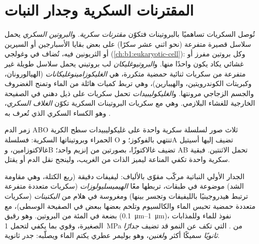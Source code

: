 \section{المقترنات السكرية وجدار النبات}

\begin{definition}\label{def:b1:carbohydrates:glycoconjugate}
تُوصل السكريات تساهميًا بالبروتينات  فتكوّن
\emph{مقترنات سكرية}. و\emph{البروتين
السكري} يحمل سلاسل قصيرة متفرعة (نحو اثني عشر
سكرًا) على بعض بقايا الأسبارجين أو السيرين أو الثريونين فيه، تُضاف في
 وغولجي (\cref{ch:b1:eukaryotic-cell}): وكل
بروتين مفرز أو غشائي يكاد يكون واحدًا منها.
و\emph{البروتيوغليكان} لب بروتيني يحمل سلاسل
طويلة غير متفرعة من سكريات ثنائية حمضية متكررة، هي
\emph{الغليكوزامينوغليكانات} (الهيالورونان،
وكبريتات الكوندرويتين، والهيبارين)، وهي تربط كميات هائلة من الماء
وتمنح الغضروف والجسم الزجاجي  مرونتها.
و\emph{الغليكوليبيدات} تحمل سكريات على ذيل دهني في
الصفيحة الخارجية للغشاء البلازمي. وهي مع سكريات البروتينات السكرية
تكوّن \emph{الغلاف السكري}، وهو الكساء السكري الذي
تُعرف به .
\end{definition}

\begin{example}\label{ex:b1:carbohydrates:abo}
زمر الدم ABO ثلاث صور لسلسلة سكرية واحدة على غليكوليبيدات سطح الكرية
الحمراء وبروتيناتها السكرية: فسلسلة O تنتهي بالفوكوز؛ وA تضيف إليها
أسيتيل غالاكتوزامين، وB تضيف غالاكتوزًا، بصورتين من إنزيم واحد؛
 AB تحمل الاثنتين. فبقية سكرية واحدة تكفي  المناعة ليميز
الذات من الغريب، ولينجح نقل الدم أو يقتل.
\end{example}

\begin{proposition}\label{prop:b1:carbohydrates:wall}
الجدار الأولي  النباتية مركّب مقوّى بالألياف: ليفيفات 
دقيقة (ربع الكتلة، وهي مقاومة الشد) موضوعة في طبقات، تربطها معًا
\emph{الهيميسليولوزات} (سكريات متعددة متفرعة ترتبط هيدروجينيًا
بالليفيفات وتجسر بينها) ومغروسة في هلام من \emph{البكتينات} (سكريات
متعددة حمضية تحبس الماء والكالسيوم وتلحم  بعضها ببعض في
الصفيحة الوسطى)، مع بضعة في المئة من البروتين. وهو رقيق
(\qtyrange{0.1}{1}{\micro m})، نفوذ للماء وللمذابات الصغيرة، وقوي بما
يكفي لتحمل \qty{1}{MPa} من .  التي تكف عن النمو قد
تضيف \emph{جدارًا ثانويًا} سميكًا  أكثر و\emph{لغنين}، وهو
بوليمر عطري يكتم الماء ويصلّبه:  جدر ثانوية.
\end{proposition}


